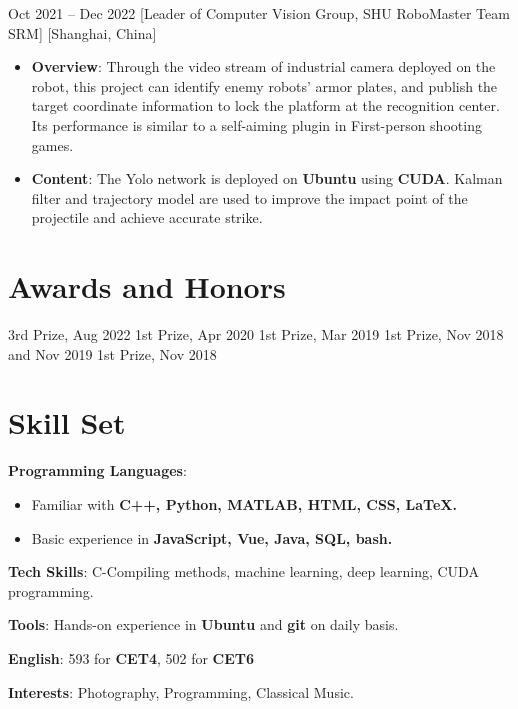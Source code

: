 \documentclass{chicv}
\begin{document}
  {Oct 2021 -- Dec 2022}
  [Leader of Computer Vision Group, SHU RoboMaster Team SRM]
  [Shanghai, China]
  \begin{itemize}
    \item \textbf{Overview}: Through the video stream of industrial camera deployed on the robot, this project can identify enemy robots' armor plates, and publish the target coordinate information to lock the platform at the recognition center. Its performance is similar to a self-aiming plugin in First-person shooting games.
    \item \textbf{Content}: The Yolo network is deployed on \textbf{Ubuntu} using \textbf{CUDA}. Kalman filter and trajectory model are used to improve the impact point of the projectile and achieve accurate strike.
  \end{itemize}

\section{Awards and Honors}
 {3rd Prize, Aug 2022}
 {1st Prize, Apr 2020}
 {1st Prize, Mar 2019}
 {1st Prize, Nov 2018 and Nov 2019}
 {1st Prize, Nov 2018}

\section{Skill Set}
\begin{compactlist}
  \item \textbf{Programming Languages}: 
  \begin{itemize}
    \item Familiar with \textbf{C++, Python, MATLAB, HTML, CSS, \LaTeX.}
    \item Basic experience in \textbf{JavaScript, Vue, Java, SQL, bash.}
  \end{itemize}
  \item \textbf{Tech Skills}: C-Compiling methods, machine learning, deep learning, CUDA programming.
  \item \textbf{Tools}: Hands-on experience in \textbf{Ubuntu} and \textbf{git} on daily basis.
  \item \textbf{English}: 593 for \textbf{CET4}, 502 for \textbf{CET6}
  \item \textbf{Interests}: Photography, Programming, Classical Music.
\end{compactlist}
\end{document}
